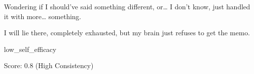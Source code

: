 \begin{tcolorbox}[
    colback=gray!5, colframe=gray!50, arc=2mm, boxrule=0.5pt,
    left=5pt, right=5pt, enhanced, drop shadow, breakable
]
\begin{description}[leftmargin=3.5cm, labelwidth=3.2cm, font=\bfseries, nosep]
    \item[Belief] Wondering if I should’ve said something different, or… I don't know, just handled it with more… something.
    \item[Action] I will lie there, completely exhausted, but my brain just refuses to get the memo.
    \item[Belief Type] low\_self\_efficacy
    \item[Metrics] Score: 0.8 (High Consistency)
\end{description}
\end{tcolorbox}

